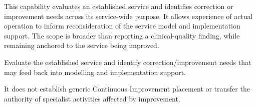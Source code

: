 This capability evaluates an established service and identifies correction or improvement needs across its service-wide purpose. It allows experience of actual operation to inform reconsideration of the service model and implementation support. The scope is broader than reporting a clinical-quality finding, while remaining anchored to the service being improved.



Evaluate the established service and identify correction/\allowbreak{}improvement needs that may feed back into modelling and implementation support.



It does not establish generic Continuous Improvement placement or transfer the authority of specialist activities affected by improvement.


